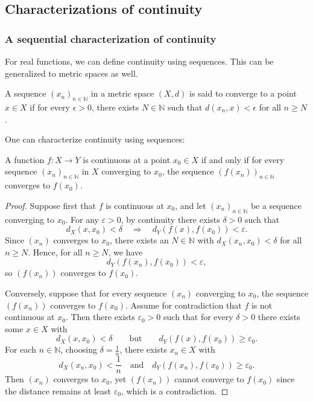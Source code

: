 \subsection{Characterizations of continuity}

\subsubsection{A sequential characterization of continuity}

For real functions, we can define continuity using sequences. This can be generalized to metric spaces as well.

\begin{definition}
    A sequence $(x_n)_{n\in\mathbb{N}}$ in a metric space $(X,d)$ is said to converge to a point $x\in X$ if for every $\epsilon>0$, there exists $N\in\mathbb{N}$ such that $d(x_n,x)<\epsilon$ for all $n\ge N$.
\end{definition}

One can characterize continuity using sequences:
\begin{proposition}
    A function $f:X\to Y$ is continuous at a point $x_0\in X$ if and only if for every sequence $(x_n)_{n\in\mathbb{N}}$ in $X$ converging to $x_0$, the sequence $(f(x_n))_{n\in\mathbb{N}}$ converges to $f(x_0)$.
\end{proposition}
\begin{proof}
  Suppose first that $f$ is continuous at $x_0$, and let $(x_n)_{n\in\mathbb{N}}$ be a sequence converging to $x_0$. For any $\varepsilon>0$, by continuity there exists $\delta>0$ such that
  \[
  d_X(x,x_0)<\delta \quad\Longrightarrow\quad d_Y(f(x),f(x_0))<\varepsilon.
  \]
  Since $(x_n)$ converges to $x_0$, there exists an $N\in\mathbb{N}$ with $d_X(x_n,x_0)<\delta$ for all $n\ge N$. Hence, for all $n\ge N$, we have
  \[
  d_Y(f(x_n),f(x_0))<\varepsilon,
  \]
  so $(f(x_n))$ converges to $f(x_0)$.

  Conversely, suppose that for every sequence $(x_n)$ converging to $x_0$, the sequence $(f(x_n))$ converges to $f(x_0)$. Assume for contradiction that $f$ is not continuous at $x_0$. Then there exists $\varepsilon_0>0$ such that for every $\delta>0$ there exists some $x\in X$ with
  \[
  d_X(x,x_0)<\delta \qquad\text{but}\qquad d_Y(f(x),f(x_0))\ge \varepsilon_0.
  \]
  For each $n\in\mathbb{N}$, choosing $\delta=\frac{1}{n}$, there exists $x_n\in X$ with
  \[
  d_X(x_n,x_0)<\frac{1}{n} \quad\text{and}\quad d_Y(f(x_n),f(x_0))\ge \varepsilon_0.
  \]
  Then $(x_n)$ converges to $x_0$, yet $(f(x_n))$ cannot converge to $f(x_0)$ since the distance remains at least $\varepsilon_0$, which is a contradiction.
\end{proof}

